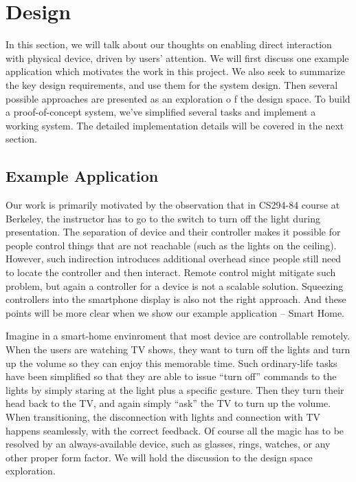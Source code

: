 \section{Design}
\label{sec:design}



In this section, we will talk about our thoughts on enabling direct interaction with physical device, driven by users' attention. We will first discuss one example application which motivates the work in this project. We also seek to summarize the key design requirements, and use them for the system design. Then several possible approaches are presented as an exploration o f the design space. To build a proof-of-concept system, we've simplified several tasks and implement a working system. The detailed implementation details will be covered in the next section.

\subsection{Example Application}
\label{sec:example-application}

Our work is primarily motivated by the observation that in CS294-84 course at Berkeley, the instructor has to go to the switch to turn off the light during presentation. The separation of device and their controller makes it possible for people control things that are not reachable (such as the lights on the ceiling). However, such indirection introduces additional overhead since people still need to locate the controller and then interact. Remote control might mitigate such problem, but again a controller for a device is not a scalable solution. Squeezing controllers into the smartphone display is also not the right approach. And these points will be more clear when we show our example application -- Smart Home.

Imagine in a smart-home envinroment that most device are controllable remotely. When the users are watching TV shows, they want to turn off the lights and turn up the volume so they can enjoy this memorable time. Such ordinary-life tasks have been simplified so that they are able to issue ``turn off'' commands to the lights by simply staring at the light plus a specific gesture. Then they turn their head back to the TV, and again simply ``ask'' the TV to turn up the volume. When transitioning, the disconnection with lights and connection with TV happens seamlessly, with the correct feedback. Of course all the magic has to be resolved by an always-available device, such as glasses, rings, watches, or any other proper form factor. We will hold the discussion to the design space exploration. 

